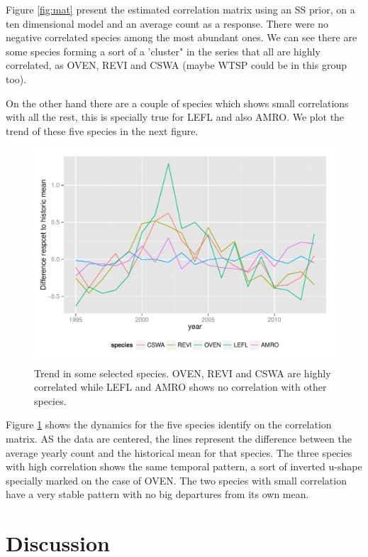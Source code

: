 \documentclass{article}
\begin{document}
Figure \ref{fig:mat} present the estimated correlation matrix using an SS prior, on a ten dimensional model and an average count as a response. There were no negative correlated species among the most abundant ones. We can see there are some species forming a sort of a 'cluster" in the series that all are highly correlated, as  OVEN, REVI and CSWA (maybe WTSP could be in this group too). 

On the other hand there are a couple of species which shows small correlations with all the rest, this is specially true for LEFL and also AMRO.   We plot the trend of these five species in the next figure. 

\begin{figure}[hbpt]
\centering
\includegraphics[width=\textwidth]{spcor}
 \vspace{-.5in}
\caption{Trend in some selected species. OVEN, REVI and CSWA are highly correlated while LEFL and AMRO shows no correlation with other species. \label{trend}}
\end{figure}

Figure \ref{trend}  shows the dynamics for the five species identify on the correlation matrix. AS the data are centered, the lines represent the difference between the average yearly count and the historical mean for that species. The three species with high correlation shows the same temporal pattern, a sort of inverted u-shape specially marked on the case of OVEN. The two species with small correlation have a very stable pattern with no big departures from its own mean. 

\section{Discussion} 
\end{document}

